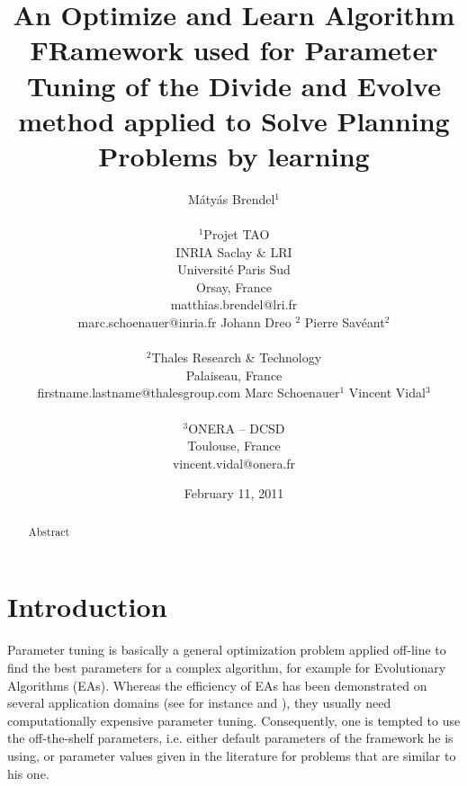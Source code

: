 \documentclass{article}
\begin{document}
\title{An Optimize and Learn Algorithm FRamework used for Parameter Tuning of the Divide and Evolve method applied to Solve Planning Problems by learning}


\author{M{\'a}ty{\'a}s Brendel$^{1}$ \\ \\ $^{1}$Projet TAO \\ INRIA Saclay \& LRI\\ Universit{\'e} Paris Sud \\ Orsay, France\\ matthias.brendel@lri.fr \\ marc.schoenauer@inria.fr
\And  Johann Dreo $^{2}$ 
\And Pierre Sav{\'e}ant$^{2}$ \\ \\ $^{2}$Thales Research \& Technology\\ Palaiseau, France\\firstname.lastname@thalesgroup.com
\And Marc Schoenauer$^{1}$ 
\And Vincent Vidal$^{3}$ \\ \\ $^{3}$ONERA -- DCSD \\ Toulouse, France \\ vincent.vidal@onera.fr}





\date{February 11, 2011}
\maketitle
\begin{abstract}
\noindent Abstract
\end{abstract}
\section{Introduction}

Parameter tuning is basically a general optimization problem applied off-line to find the best parameters for a complex algorithm, for example for Evolutionary Algorithms (EAs). Whereas the efficiency of EAs has been demonstrated on several application domains (see for instance \cite{practice08} and \cite{ParameterSettingBook07}), they usually need computationally expensive parameter tuning. Consequently, one is tempted to use the off-the-shelf parameters, i.e. either default parameters of the framework he is using, or parameter values given in the literature for problems that are similar to his one. 
\end{document}
